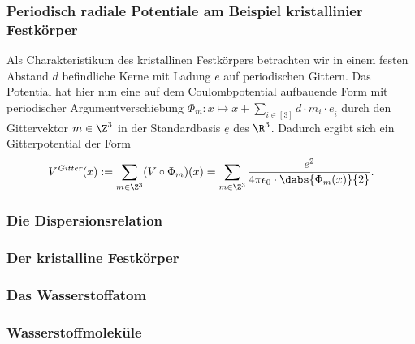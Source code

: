 \documentclass[../main.tex]{subfiles}
\begin{document}
        \subsubsection{Periodisch radiale Potentiale am Beispiel kristallinier Festkörper}
            Als Charakteristikum des kristallinen Festkörpers betrachten wir in einem festen Abstand $d$ befindliche Kerne mit Ladung $e$ auf periodischen Gittern. Das Potential hat hier nun eine auf dem Coulombpotential aufbauende Form mit periodischer Argumentverschiebung $\Phi_m:x\mapsto x + \sum_{i\in[3]}d\cdot m_i\cdot \underline e_i$ durch den Gittervektor $m\in\Z^3$ in der Standardbasis $\underline e$ des $\R^3$. Dadurch ergibt sich ein Gitterpotential der Form
            \[
                V^\textit{Gitter}(x):= \sum_{m\in\Z^3}(V\circ\Phi_m)(x) = \sum_{m\in\Z^3}\frac{e^2}{4\pi\epsilon_0\cdot\dabs{\Phi_m(x)}{2}}.
            \]


        \subsubsection*{Die Dispersionsrelation}


        \subsubsection{Der kristalline Festkörper}


        \subsubsection{Das Wasserstoffatom}


        \subsubsection*{Wasserstoffmoleküle}

    
\end{document}

